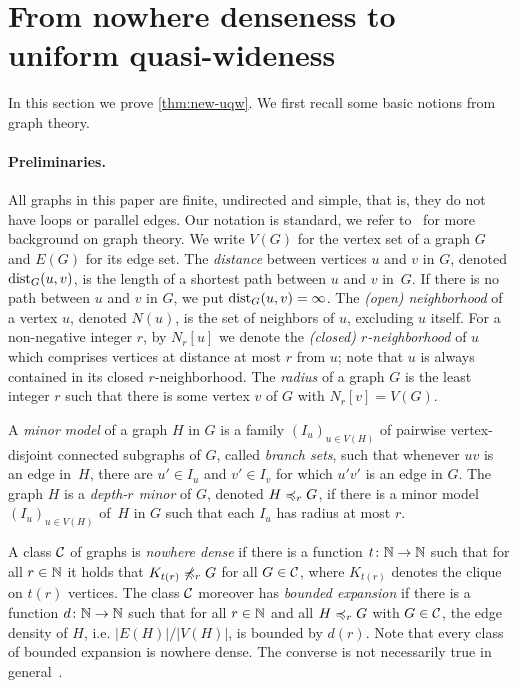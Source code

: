 \section{From nowhere denseness to uniform quasi-wideness}\label{sec:uqw}

In this section we prove \cref{thm:new-uqw}. 
We first recall some basic notions from graph theory. 

\paragraph*{Preliminaries.}
All graphs in this paper are finite, undirected and simple, that is, 
they do not have loops or parallel edges. Our notation is standard,
we refer to~\cite{diestel2012graph} for more background on 
graph theory. 
We write $V(G)$ for the vertex set of a graph $G$ and
$E(G)$ for its edge set. 
The {\em{distance}} between vertices $u$ and $v$ in $G$, denoted $\mathrm{dist}_G(u,v)$, is the length of a shortest path between $u$ and $v$ in~$G$.
If there is no path between $u$ and $v$ in $G$, we put $\mathrm{dist}_G(u,v)=\infty$.
The {\em{(open) neighborhood}} of a vertex $u$, denoted $N(u)$, is the set of neighbors of $u$, excluding $u$ itself.
For a non-negative integer $r$, by $N_r[u]$ we denote the {\em{(closed) $r$-neighborhood}} of $u$ which comprises vertices at distance at most $r$ from $u$; note that $u$ is always contained in its closed $r$-neighborhood. The \emph{radius} of a graph $G$ is the least integer $r$ such that there is some vertex $v$ of $G$ with $N_r[v]=V(G)$.


A {\em{minor model}} of a graph $H$ in $G$ is a family $(I_u)_{u\in V(H)}$ of pairwise vertex-disjoint connected subgraphs of $G$, called {\em{branch sets}},
such that whenever $uv$ is an edge in~$H$, there are $u'\in I_u$ and $v'\in I_v$ for which $u'v'$ 
is an edge in $G$.
The graph $H$ is a {\em{depth-$r$ minor}} of $G$, denoted $H\preccurlyeq_rG$, if there is a minor model
$(I_u)_{u\in V(H)}$ of~$H$ in $G$ such that each $I_u$ has radius at most $r$.

A class $\mathcal{C}$ of graphs is \emph{nowhere dense} if there is a function 
$t\colon \mathbb{N}\rightarrow \mathbb{N}$ such that for all $r\in \mathbb{N}$ it holds that $K_{t(r)}\not\preccurlyeq_r G$
for all $G\in \mathcal{C}$, where $K_{t(r)}$ denotes the clique on $t(r)$ vertices.
The class $\mathcal{C}$ moreover has \emph{bounded expansion}
if there is a function $d\colon\mathbb{N}\rightarrow\mathbb{N}$ such that for all 
$r\in \mathbb{N}$ and all $H\preccurlyeq_rG$ with $G\in\mathcal{C}$, the edge density
of $H$, i.e. $|E(H)|/|V(H)|$, is bounded by $d(r)$. Note that every 
class of bounded expansion is nowhere dense. The converse is not necessarily true in general~\cite{sparsity}.

